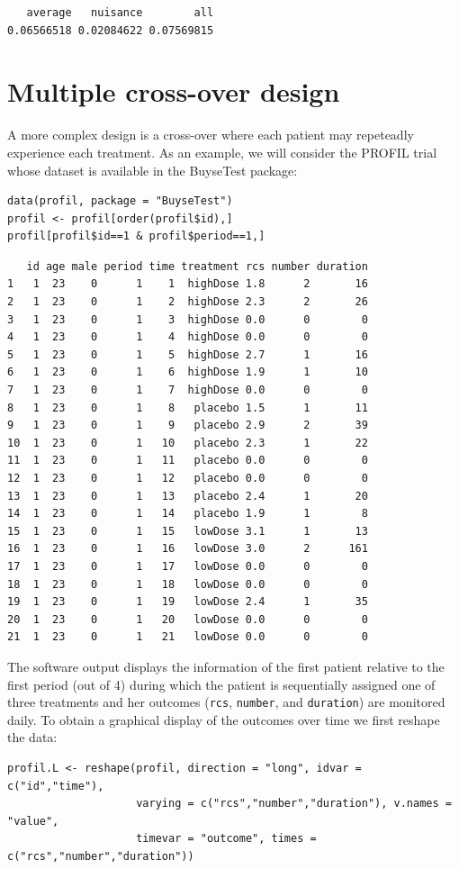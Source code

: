 \documentclass[12pt]{article}
\begin{document}
\begin{verbatim}
   average   nuisance        all 
0.06566518 0.02084622 0.07569815
\end{verbatim}


\clearpage

\section{Multiple cross-over design}
\label{sec:org96d7aaf}
A more complex design is a cross-over where each patient may
repeteadly experience each treatment. As an example, we will consider
the PROFIL trial whose dataset is available in the BuyseTest package:
\lstset{language=r,label= ,caption= ,captionpos=b,numbers=none}
\begin{lstlisting}
data(profil, package = "BuyseTest")
profil <- profil[order(profil$id),]
profil[profil$id==1 & profil$period==1,]
\end{lstlisting}

\begin{verbatim}
   id age male period time treatment rcs number duration
1   1  23    0      1    1  highDose 1.8      2       16
2   1  23    0      1    2  highDose 2.3      2       26
3   1  23    0      1    3  highDose 0.0      0        0
4   1  23    0      1    4  highDose 0.0      0        0
5   1  23    0      1    5  highDose 2.7      1       16
6   1  23    0      1    6  highDose 1.9      1       10
7   1  23    0      1    7  highDose 0.0      0        0
8   1  23    0      1    8   placebo 1.5      1       11
9   1  23    0      1    9   placebo 2.9      2       39
10  1  23    0      1   10   placebo 2.3      1       22
11  1  23    0      1   11   placebo 0.0      0        0
12  1  23    0      1   12   placebo 0.0      0        0
13  1  23    0      1   13   placebo 2.4      1       20
14  1  23    0      1   14   placebo 1.9      1        8
15  1  23    0      1   15   lowDose 3.1      1       13
16  1  23    0      1   16   lowDose 3.0      2      161
17  1  23    0      1   17   lowDose 0.0      0        0
18  1  23    0      1   18   lowDose 0.0      0        0
19  1  23    0      1   19   lowDose 2.4      1       35
20  1  23    0      1   20   lowDose 0.0      0        0
21  1  23    0      1   21   lowDose 0.0      0        0
\end{verbatim}

The software output displays the information of the first patient
relative to the first period (out of 4) during which the patient is
sequentially assigned one of three treatments and her outcomes (\texttt{rcs},
\texttt{number}, and \texttt{duration}) are monitored daily. To obtain a graphical
display of the outcomes over time we first reshape the data:
\lstset{language=r,label= ,caption= ,captionpos=b,numbers=none}
\begin{lstlisting}
profil.L <- reshape(profil, direction = "long", idvar = c("id","time"),
                    varying = c("rcs","number","duration"), v.names = "value",
                    timevar = "outcome", times = c("rcs","number","duration"))
\end{lstlisting}
\end{document}
